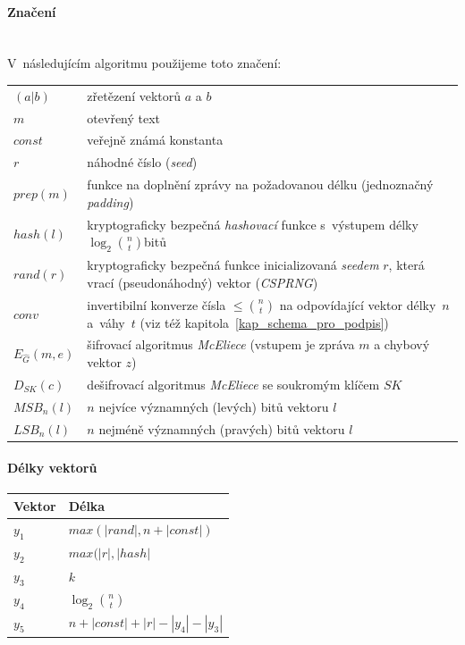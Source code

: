 \documentclass[thesis=M,czech,hidelinks]{FITthesis}[2012/06/26]
\newcommand{\0}{{\textcolor[gray]{0.75}{0}}}
\begin{document}
\paragraph{Značení} \hfil \\
V~následujícím algoritmu použijeme toto značení:
\begin{center}
\begin{tabular}{l p{10cm}}
    $(a|b)$         &   zřetězení vektorů $a$ a $b$ \\
    $m$             &   otevřený text \\
    $const$         &   veřejně známá konstanta \\
    $r$             &   náhodné číslo (\emph{seed}) \\
    $prep(m)$       &   funkce na doplnění zprávy na požadovanou délku
                        (jednoznačný \emph{padding}) \\
    $hash(l)$       &   kryptograficky bezpečná \emph{hashovací} funkce
                        s~výstupem délky $\log_2 \binom{n}{t}$\;bitů \\
    $rand(r)$       &   kryptograficky bezpečná funkce inicializovaná
                        \emph{seedem} $r$, která vrací (pseudonáhodný) vektor
                        (\emph{CSPRNG}) \\
    $conv$          &   invertibilní konverze čísla $\leq \binom{n}{t}$ na
                        odpovídající vektor délky~$n$ a~váhy~$t$ (viz též
                        kapitola~\ref{kap_schema_pro_podpis}) \\
    $E_{\hat{G}}(m,e)$
                    &   šifrovací algoritmus \emph{McEliece} (vstupem je
                        zpráva $m$ a chybový vektor $z$) \\
    $D_{SK}(c)$     &   dešifrovací algoritmus \emph{McEliece} se soukromým
                        klíčem $SK$ \\
    $MSB_n(l)$      &   $n$ nejvíce významných (levých) bitů vektoru $l$ \\
    $LSB_n(l)$      &   $n$ nejméně významných (pravých) bitů vektoru $l$ \\
\end{tabular}
\end{center}


\paragraph{Délky vektorů}
\begin{center}
\begin{tabular}{l l}
    Vektor      & Délka                                 \\
    \hline
    $y_1$       & $max(|rand|, n+|const|)$              \\
    $y_2$       & $max(|r|,|hash|$                      \\
    $y_3$       & $k$                                   \\
    $y_4$       & $\log_2 \binom{n}{t}$                 \\
    $y_5$       & $n + |const| + |r| - |y_4| - |y_3|$   \\
\end{tabular}
\end{center}
\end{document}
